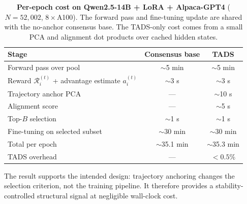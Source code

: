 \begin{table}[t]
\centering
\caption{\textbf{Per-epoch cost on Qwen2.5-14B + LoRA + Alpaca-GPT4}
($N=52{,}002$, $8\times$A100). The forward pass and fine-tuning
update are shared with the no-anchor consensus base. The
\textsc{TADS}-only cost comes from a small PCA and alignment dot
products over cached hidden states.}
\label{tab:cost-14b-main}
\small
\begin{tabular}{lcc}
\toprule
Stage & Consensus base & \textsc{TADS} \\
\midrule
Forward pass over pool          & $\sim$5 min  & $\sim$5 min  \\
Reward $\mathcal{R}_i^{(t)}$ + advantage estimate $a_i^{(t)}$
                                & $\sim$3 s    & $\sim$3 s    \\
Trajectory anchor PCA           & ---          & $\sim$10 s   \\
Alignment score                 & ---          & $\sim$5 s    \\
Top-$B$ selection                & $\sim$1 s    & $\sim$1 s    \\
Fine-tuning on selected subset   & $\sim$30 min & $\sim$30 min \\
\midrule
Total per epoch                  & $\sim$35.1 min & $\sim$35.3 min \\
\textsc{TADS} overhead           & ---          & $<0.5\%$     \\
\bottomrule
\end{tabular}
\end{table}

The result supports the intended design: trajectory anchoring
changes the selection criterion, not the training pipeline. It
therefore provides a stability-controlled structural signal at
negligible wall-clock cost.
